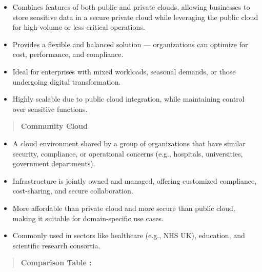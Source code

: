 \documentclass[12pt]{article}
\begin{document}
\begin{itemize}
\item
  Combines features of both public and private clouds, allowing
  businesses to store sensitive data in a secure private cloud while
  leveraging the public cloud for high-volume or less critical
  operations.
\item
  Provides a flexible and balanced solution --- organizations can
  optimize for cost, performance, and compliance.
\item
  Ideal for enterprises with mixed workloads, seasonal demands, or those
  undergoing digital transformation.
\item
  Highly scalable due to public cloud integration, while maintaining
  control over sensitive functions.
\end{itemize}

\begin{quote}
\textbf{Community Cloud}
\end{quote}

\begin{itemize}
\item
  A cloud environment shared by a group of organizations that have
  similar security, compliance, or operational concerns (e.g.,
  hospitals, universities, government departments).
\item
  Infrastructure is jointly owned and managed, offering customized
  compliance, cost-sharing, and secure collaboration.
\item
  More affordable than private cloud and more secure than public cloud,
  making it suitable for domain-specific use cases.
\item
  Commonly used in sectors like healthcare (e.g., NHS UK), education,
  and scientific research consortia.
\end{itemize}

\begin{quote}
\textbf{Comparison Table :}
\end{quote}
\end{document}
